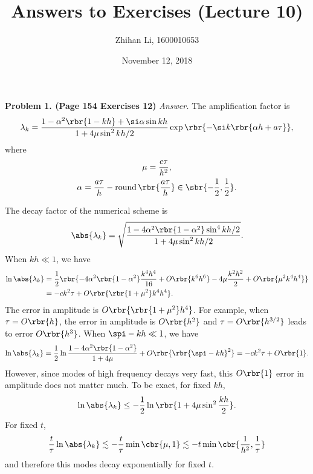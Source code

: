 \documentclass[english, nochinese]{pnote}
\title{Answers to Exercises (Lecture 10)}
\author{Zhihan Li, 1600010653}
\date{November 12, 2018}
\DeclareMathOperator\opround{\mathrm{round}}
\begin{document}
\maketitle

\textbf{Problem 1. (Page 154 Exercises 12)} \textit{Answer.} The amplification factor is
\begin{equation}
\lambda_k = \frac{ 1 - \alpha^2 \rbr{ 1 - k h } + \si \alpha \sin k h }{ 1 + 4 \mu \sin^2 k h / 2 } \exp \rbr{ -\si k \rbr{ \alpha h + a \tau } },
\end{equation}
where
\begin{gather}
\mu = \frac{ c \tau }{h^2}, \\
\alpha = \frac{ a \tau }{h} - \opround \rbr{ \frac{ a \tau }{h} } \in \sbr{ -\frac{1}{2}, \frac{1}{2} }.
\end{gather}

The decay factor of the numerical scheme is
\begin{equation}
\abs{\lambda_k} = \sqrt{ \frac{ 1 - 4 \alpha^2 \rbr{ 1 - \alpha^2 } \sin^4 k h / 2 }{ 1 + 4 \mu \sin^2 k h / 2 } }.
\end{equation}
When $ k h \ll 1 $, we have
\begin{equation}
\begin{split}
\ln \abs{\lambda_k} &= \frac{1}{2} \rbr{ -4 \alpha^2 \rbr{ 1 - \alpha^2 } \frac{ k^4 h^4 }{16} + O \rbr{ k^6 h^6 } - 4 \mu \frac{ k^2 h^2 }{2} + O \rbr{ \mu^2 k^4 h^4 } } \\
&= -c k^2 \tau + O \rbr{ \rbr{ 1 + \mu^2 } k^4 h^4 }.
\end{split}
\end{equation}
The error in amplitude is $ O \rbr{ \rbr{ 1 + \mu^2 } h^4 } $. For example, when $ \tau = O \rbr{h} $, the error in amplitude is $ O \rbr{h^2} $ and $ \tau = O \rbr{ h^{ 3 / 2 } } $ leads to error $ O \rbr{h^3} $. When $ \spi - k h \ll 1 $, we have
\begin{equation}
\ln \abs{\lambda_k} = \frac{1}{2} \ln \frac{ 1 - 4 \alpha^2 \rbr{ 1 - \alpha^2 } }{ 1 + 4 \mu } + O \rbr{\rbr{ \spi - k h }^2} = -c k^2 \tau + O \rbr{1}.
\end{equation}
However, since modes of high frequency decays very fast, this $ O \rbr{1} $ error in amplitude does not matter much. To be exact, for fixed $ k h $,
\begin{equation}
\ln \abs{\lambda_k} \le -\frac{1}{2} \ln \rbr{ 1 + 4 \mu \sin^2 \frac{ k h }{2} }.
\end{equation}
For fixed $t$,
\begin{equation}
\frac{t}{\tau} \ln \abs{\lambda_k} \lesssim -\frac{t}{\tau} \min \cbr{ \mu, 1 } \lesssim -t \min \cbr{ \frac{1}{h^2}, \frac{1}{\tau} }
\end{equation}
and therefore this modes decay exponentially for fixed $t$.
\end{document}
